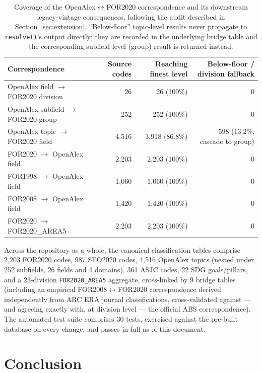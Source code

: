 \documentclass[11pt]{article}
\begin{document}
\begin{table}[htbp]
\centering
\small
\begin{tabular}{@{}lrrr@{}}
\toprule
\textbf{Correspondence} & \textbf{Source codes} & \textbf{Reaching finest level} & \textbf{Below-floor / division fallback} \\
\midrule
OpenAlex field $\rightarrow$ FOR2020 division & 26 & 26 (100\%) & 0 \\
OpenAlex subfield $\rightarrow$ FOR2020 group & 252 & 252 (100\%) & 0 \\
OpenAlex topic $\rightarrow$ FOR2020 field & 4{,}516 & 3{,}918 (86.8\%) & 598 (13.2\%, cascade to group) \\
FOR2020 $\rightarrow$ OpenAlex field & 2{,}203 & 2{,}203 (100\%) & 0 \\
FOR1998 $\rightarrow$ OpenAlex field & 1{,}060 & 1{,}060 (100\%) & 0 \\
FOR2008 $\rightarrow$ OpenAlex field & 1{,}420 & 1{,}420 (100\%) & 0 \\
FOR2020 $\rightarrow$ FOR2020\_AREA5 & 2{,}203 & 2{,}203 (100\%) & 0 \\
\bottomrule
\end{tabular}
\caption{Coverage of the OpenAlex$\leftrightarrow$FOR2020 correspondence and its
downstream legacy-vintage consequences, following the audit described in
Section~\ref{sec:extension}. ``Below-floor'' topic-level results never propagate to
\texttt{resolve()}'s output directly; they are recorded in the underlying bridge table
and the corresponding subfield-level (group) result is returned instead.}
\label{tab:coverage}
\end{table}

Across the repository as a whole, the canonical classification tables comprise 2{,}203
FOR2020 codes, 987 SEO2020 codes, 4{,}516 OpenAlex topics (nested under 252 subfields,
26 fields and 4 domains), 361 ASJC codes, 22 SDG goals/pillars, and a 23-division
\texttt{FOR2020\_AREA5} aggregate, cross-linked by 9 bridge tables (including an
empirical FOR2008$\leftrightarrow$FOR2020 correspondence derived independently from ARC
ERA journal classifications, cross-validated against --- and agreeing exactly with, at
division level --- the official ABS correspondence). The automated test suite comprises
30 tests, exercised against the pre-built database on every change, and passes in full
as of this document.

\section{Conclusion}
\end{document}

